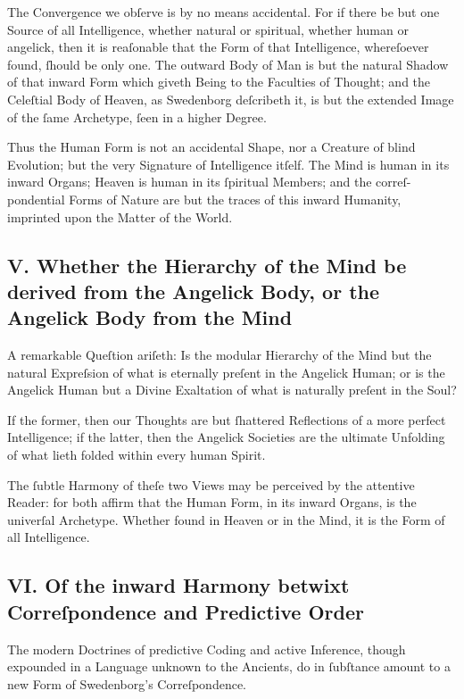 \documentclass[12pt]{article}
\begin{document}
The Convergence we obſerve is by no means accidental. For if there be but one 
Source of all Intelligence, whether natural or spiritual, whether human or 
angelick, then it is reaſonable that the Form of that Intelligence, whereſoever 
found, ſhould be only one. The outward Body of Man is but the natural Shadow 
of that inward Form which giveth Being to the Faculties of Thought; and the 
Celeſtial Body of Heaven, as Swedenborg deſcribeth it, is but the extended 
Image of the ſame Archetype, ſeen in a higher Degree.

Thus the Human Form is not an accidental Shape, nor a Creature of blind 
Evolution; but the very Signature of Intelligence itſelf. The Mind is human in 
its inward Organs; Heaven is human in its ſpiritual Members; and the correſ-
pondential Forms of Nature are but the traces of this inward Humanity, 
imprinted upon the Matter of the World.

\subsection*{V. Whether the Hierarchy of the Mind be derived from the Angelick Body, or the Angelick Body from the Mind}

A remarkable Queſtion ariſeth: Is the modular Hierarchy of the Mind but the 
natural Expreſsion of what is eternally preſent in the Angelick Human; or is 
the Angelick Human but a Divine Exaltation of what is naturally preſent in the 
Soul?

If the former, then our Thoughts are but ſhattered Reflections of a more perfect 
Intelligence; if the latter, then the Angelick Societies are the ultimate 
Unfolding of what lieth folded within every human Spirit.

The ſubtle Harmony of theſe two Views may be perceived by the attentive Reader: 
for both affirm that the Human Form, in its inward Organs, is the univerſal 
Archetype. Whether found in Heaven or in the Mind, it is the Form of all 
Intelligence.

\subsection*{VI. Of the inward Harmony betwixt Correſpondence and Predictive Order}

The modern Doctrines of predictive Coding and active Inference, though 
expounded in a Language unknown to the Ancients, do in ſubſtance amount to a 
new Form of Swedenborg’s Correſpondence.
\end{document}
